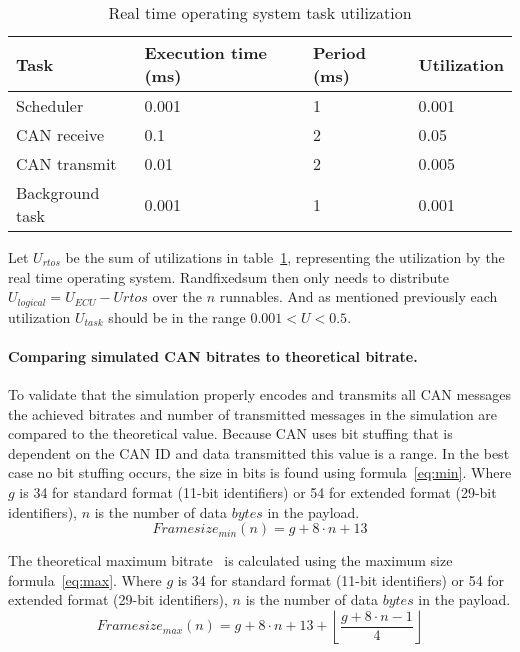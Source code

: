 \begin{table}[htb]
    \centering
    \begin{tabular}{@{}llll@{}}
    \toprule
    Task            & Execution time (ms) & Period (ms) & Utilization \\ \midrule
    Scheduler       & 0.001               & 1           & 0.001       \\
    CAN receive     & 0.1                 & 2           & 0.05        \\
    CAN transmit    & 0.01                & 2           & 0.005       \\
    Background task & 0.001               & 1           & 0.001       \\ \bottomrule
    \end{tabular}
    \caption{Real time operating system task utilization}
    \label{tab:util}
\end{table}

Let $U_{rtos}$ be the sum of utilizations in table~\ref{tab:util}, representing the utilization by the real time operating system. Randfixedsum then only needs to distribute $U_{logical}=U_{ECU}-U{rtos}$ over the $n$ runnables. And as mentioned previously each utilization $U_{task}$ should be in the range $0.001 < U < 0.5$.


\paragraph{Comparing simulated CAN bitrates to theoretical bitrate.}

To validate that the simulation properly encodes and transmits all CAN messages the achieved bitrates and number of transmitted messages in the simulation are compared to the theoretical value. Because CAN uses bit stuffing that is dependent on the CAN ID and data transmitted this value is a range. In the best case no bit stuffing occurs, the size in bits is found using formula~\ref{eq:min}. Where $g$ is 34 for standard format (11-bit identifiers) or 54 for extended format (29-bit identifiers), $n$ is the number of data $bytes$ in the payload.
\begin{equation}
    \label{eq:min}
    Framesize_{min}(n) = g+8\cdot n + 13
\end{equation}

The theoretical maximum bitrate~\cite{davis2007controller} is calculated using the maximum size formula~\ref{eq:max}. Where $g$ is 34 for standard format (11-bit identifiers) or 54 for extended format (29-bit identifiers), $n$ is the number of data $bytes$ in the payload.
\begin{equation}
    \label{eq:max}
Framesize_{max}(n) = g +8\cdot n +13 +\left\lfloor\frac{g+8\cdot n-1}{4}\right\rfloor
\end{equation}

